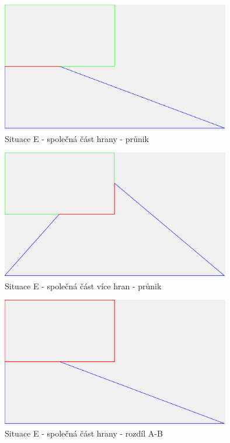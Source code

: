\documentclass[a4paper,11pt,twoside]{article}
\begin{document}
\vspace{0.2cm}
\begin{figure}[hbt!] 
\begin{center}
\includegraphics[width=10cm]{pictures/E_intersect.png} 
\caption[Situace E - společná část hrany - průnik]{Situace E - společná část hrany - průnik}
\label{fig:E_intersect}
\end{center}
\end{figure}

\vspace{0.2cm}
\begin{figure}[hbt!] 
\begin{center}
\includegraphics[width=10cm]{pictures/E_more_intersect.png} 
\caption[Situace E - společná část více hran - průnik]{Situace E - společná část více hran - průnik}
\label{fig:E_more_intersect}
\end{center}
\end{figure}

\vspace{0.2cm}
\begin{figure}[hbt!] 
\begin{center}
\includegraphics[width=10cm]{pictures/E_diffAB.png} 
\caption[Situace E - společná část hrany - rozdíl A-B]{Situace E - společná část hrany - rozdíl A-B}
\label{fig:E_diffAB}
\end{center}
\end{figure}
\end{document}
